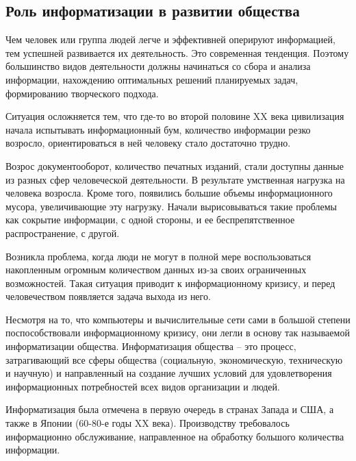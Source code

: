 \subsection{Роль информатизации в развитии общества} \label{subsect2_3_2}

Чем человек или группа людей легче и эффективней оперируют информацией, тем успешней развивается их деятельность. Это современная тенденция. Поэтому большинство видов деятельности должны начинаться со сбора и анализа информации, нахождению оптимальных решений планируемых задач, формированию творческого подхода.

Ситуация осложняется тем, что где-то во второй половине XX века цивилизация начала испытывать информационный бум, количество информации резко возросло, ориентироваться в ней человеку стало достаточно трудно.

Возрос документооборот, количество печатных изданий, стали доступны данные из разных сфер человеческой деятельности. В результате умственная нагрузка на человека возросла. Кроме того, появились большие объемы информационного мусора, увеличивающие эту нагрузку. Начали вырисовываться такие проблемы как сокрытие информации, с одной стороны, и ее беспрепятственное распространение, с другой.

Возникла проблема, когда люди не могут в полной мере воспользоваться накопленным огромным количеством данных из-за своих ограниченных возможностей. Такая ситуация приводит к информационному кризису, и перед человечеством появляется задача выхода из него.

Несмотря на то, что компьютеры и вычислительные сети сами в большой степени поспособствовали информационному кризису, они легли в основу так называемой информатизации общества. Информатизация общества – это процесс, затрагивающий все сферы общества (социальную, экономическую, техническую и научную) и направленный на создание лучших условий для удовлетворения информационных потребностей всех видов организации и людей.

Информатизация была отмечена в первую очередь в странах Запада и США, а также в Японии (60-80-е годы XX века). Производству требовалось информационно обслуживание, направленное на обработку большого количества информации.

